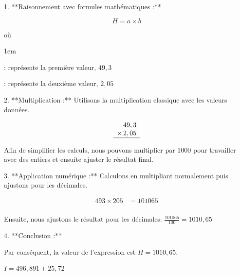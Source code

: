 \documentclass[answers]{exam}
\begin{document}
\begin{questions}
\begin{solution}
1. **Raisonnement avec formules mathématiques :**

   \[
   H = a \times b
   \]

   où
   \begin{addmargin}[4em]{1em}
   \begin{compactitem}
       \item [\(a\)]: représente la première valeur, \(49,3\)
       \item [\(b\)]: représente la deuxième valeur, \(2,05\)
   \end{compactitem}
   \end{addmargin}

2. **Multiplication :** Utilisons la multiplication classique avec les valeurs données.

   \[
   \begin{array}{r}
       \phantom{0}49,3 \\
       \times \,2,05 \\
       \hline
   \end{array}
   \]

   Afin de simplifier les calculs, nous pouvons multiplier par 1000 pour travailler avec des entiers et ensuite ajuster le résultat final.

3. **Application numérique :** Calculons en multipliant normalement puis ajustons pour les décimales.

   
   \begin{align*}
       493 \times 205 &= 101065 \\
   \end{align*}
   

   Ensuite, nous ajustons le résultat pour les décimales: \( \frac{101065}{100} = 1010,65 \)

4. **Conclusion :** 

   Par conséquent, la valeur de l'expression est \( H = \boxed{1010,65} \).
\end{solution}

\question[1] $I = 496,891 + 25,72$
\end{questions}
\end{document}
